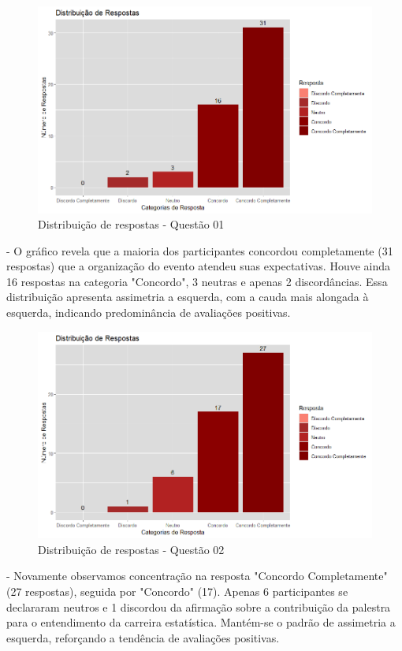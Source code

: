 \documentclass{article}
\begin{document}
\begin{figure}[htbp]
    \centering
    \includegraphics[width=0.8\linewidth]{Rplot_Q1.png}
    \caption{Distribuição de respostas - Questão 01}
    \label{fig:q1}
\end{figure}

\vspace{2\baselineskip}

- O gráfico revela que a maioria dos participantes concordou completamente (31 respostas) que a organização do evento atendeu suas expectativas. Houve ainda 16 respostas na categoria "Concordo", 3 neutras e apenas 2 discordâncias. Essa distribuição apresenta assimetria a esquerda, com a cauda mais alongada à esquerda, indicando predominância de avaliações positivas.


\vspace{1.5cm}
\begin{figure}[htbp]
    \centering
    \includegraphics[width=0.8\linewidth]{Rplot_Q2.png}
    \caption{Distribuição de respostas - Questão 02}
    \label{fig:q2}
\end{figure}

\vspace{1cm}

\newpage
- Novamente observamos concentração na resposta "Concordo Completamente" (27 respostas), seguida por "Concordo" (17). Apenas 6 participantes se declararam neutros e 1 discordou da afirmação sobre a contribuição da palestra para o entendimento da carreira estatística. Mantém-se o padrão de assimetria a esquerda, reforçando a tendência de avaliações positivas.
\end{document}
